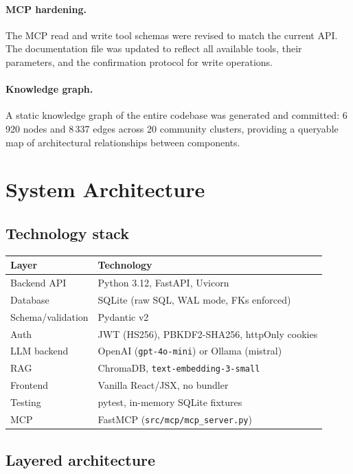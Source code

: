 \documentclass[12pt,a4paper]{article}
\begin{document}
\paragraph{MCP hardening.}
The MCP read and write tool schemas were revised to match the current API. The documentation
file was updated to reflect all available tools, their parameters, and the confirmation
protocol for write operations.

\paragraph{Knowledge graph.}
A static knowledge graph of the entire codebase was generated and committed: 6\,920 nodes and
8\,337 edges across 20 community clusters, providing a queryable map of architectural
relationships between components.

\section{System Architecture}

\subsection{Technology stack}

\begin{tabular}{@{}ll@{}}
\toprule
\textbf{Layer} & \textbf{Technology} \\
\midrule
Backend API      & Python 3.12, FastAPI, Uvicorn \\
Database         & SQLite (raw SQL, WAL mode, FKs enforced) \\
Schema/validation & Pydantic v2 \\
Auth             & JWT (HS256), PBKDF2-SHA256, httpOnly cookies \\
LLM backend      & OpenAI (\texttt{gpt-4o-mini}) or Ollama (mistral) \\
RAG              & ChromaDB, \texttt{text-embedding-3-small} \\
Frontend         & Vanilla React/JSX, no bundler \\
Testing          & pytest, in-memory SQLite fixtures \\
MCP              & FastMCP (\texttt{src/mcp/mcp\_server.py}) \\
\bottomrule
\end{tabular}

\subsection{Layered architecture}
\end{document}
